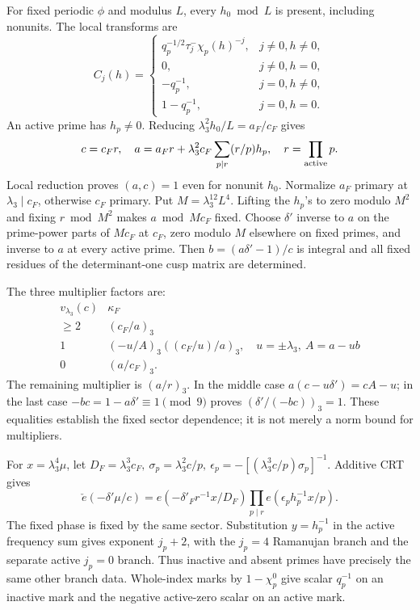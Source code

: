 \documentclass[12pt]{article}
\begin{document}
For fixed periodic \(\phi\) and modulus \(L\), every \(h_0\bmod L\)
is present, including nonunits.  The local transforms are
\[
 C_j(h)=
 \begin{cases}
 q_p^{-1/2}\tau_j^-\chi_p(h)^{-j},&j\ne0,h\ne0,\\
 0,&j\ne0,h=0,\\
 -q_p^{-1},&j=0,h\ne0,\\
 1-q_p^{-1},&j=0,h=0 .
 \end{cases}
\]
An active prime has \(h_p\ne0\).  Reducing
\(\lambda_3^2h_0/L=a_F/c_F\) gives
\[
 c=c_Fr,\quad
 a=a_Fr+\lambda_3^2c_F\sum_{p\mid r}(r/p)h_p,\quad
 r=\prod_{\rm active}p .
\]
Local reduction proves \((a,c)=1\) even for nonunit \(h_0\).
Normalize \(a_F\) primary at \(\lambda_3\mid c_F\), otherwise
\(c_F\) primary.  Put \(M=\lambda_3^{12}L^4\).
Lifting the \(h_p\)'s to zero modulo \(M^2\) and fixing
\(r\bmod M^2\) makes \(a\bmod Mc_F\) fixed.
Choose \(\delta'\) inverse to \(a\) on the prime-power parts of
\(Mc_F\) at \(c_F\), zero modulo \(M\) elsewhere on fixed primes,
and inverse to \(a\) at every active prime.
Then \(b=(a\delta'-1)/c\) is integral and all fixed residues
of the determinant-one cusp matrix are determined.

The three multiplier factors are:
\[
 \begin{array}{c|c}
 v_{\lambda_3}(c)&\kappa_F\\ \hline
 \ge2&(c_F/a)_3\\
 1&(-u/A)_3((c_F/u)/a)_3,\quad
                   u=\pm\lambda_3,\ A=a-ub\\
 0&(a/c_F)_3 .
 \end{array}
\]
The remaining multiplier is \((a/r)_3\).
In the middle case \(a(c-u\delta')=cA-u\);
in the last case \(-bc=1-a\delta'\equiv1\pmod9\) proves
\((\delta'/(-bc))_3=1\).  These equalities establish the fixed
sector dependence; it is not merely a norm bound for multipliers.

For \(x=\lambda_3^4\mu\), let
\(D_F=\lambda_3^3c_F,\ \sigma_p=\lambda_3^2c/p,\ 
\epsilon_p=-[(\lambda_3^3c/p)\sigma_p]^{-1}\).
Additive CRT gives
\[
 \check e(-\delta'\mu/c)=
 e(-\delta'_F r^{-1}x/D_F)
         \prod_{p\mid r}e(\epsilon_ph_p^{-1}x/p).
\]
The fixed phase is fixed by the same sector.  Substitution
\(y=h_p^{-1}\) in the active frequency sum gives exponent
\(j_p+2\), with the \(j_p=4\) Ramanujan branch and the
separate active \(j_p=0\) branch.  Thus inactive and absent
primes have precisely the same other branch data.  Whole-index
marks by \(1-\chi_p^0\) give scalar \(q_p^{-1}\) on an
inactive mark and the negative active-zero scalar on an active
mark.
\end{document}
